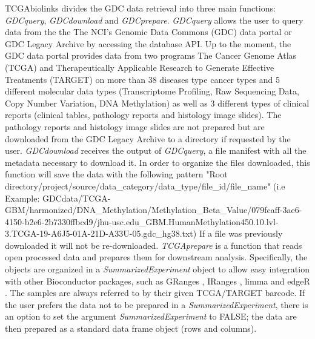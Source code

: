 TCGAbiolinks divides the GDC data retrieval into three main functions: \textit{GDCquery}, \textit{GDCdownload}
and \textit{GDCprepare}.
\textit{GDCquery} allows the user to query data from the the The NCI's Genomic Data Commons (GDC) data portal or GDC Legacy Archive by accessing the database API. Up to the moment, the GDC data portal provides data from two programs The Cancer Genome Atlas (TCGA) and Therapeutically Applicable Research to Generate Effective Treatments (TARGET)  on more
than 38 diseases type cancer types and 5 different molecular data types (Transcriptome Profiling, Raw Sequencing Data, Copy Number Variation, DNA Methylation) as well as 3 different types of clinical reports (clinical tables, pathology reports and histology image slides). The pathology
reports and histology image slides are not prepared
but are downloaded from the GDC Legacy Archive to a directory if requested by the user. \textit{GDCdownload} receives the output of \textit{GDCquery}, a file manifest with all the metadata necessary to download it. In order to organize the files downloaded, this function will save the data with the following pattern "Root directory/project/source/data\_category/data\_type/file\_id/file\_name" (i.e Example: GDCdata/TCGA-GBM/harmonized/DNA\_Methylation/Methylation\_Beta\_Value/079fcaff-3ae6-4150-b2e6-2b7330ffbcd9/jhu-usc.edu\_GBM.HumanMethylation450.10.lvl-3.TCGA-19-A6J5-01A-21D-A33U-05.gdc\_hg38.txt)
If a file was
previously downloaded it will not be re-downloaded. \textit{TCGAprepare} is a function that reads open processed data and prepares them for downstream analysis. Specifically, the objects are organized in a \textit{SummarizedExperiment}
object to allow easy integration
with other Bioconductor packages, such as GRanges \cite{lawrence2013software},
IRanges \cite{lawrence2013software}, limma \cite{ritchie2015limma} and edgeR \cite{robinson2010edger}. The samples are
always referred to by their given TCGA/TARGET barcode. If the user prefers the data not to be prepared in a \textit{SummarizedExperiment},
there is an option to set the argument \textit{SummarizedExperiment}
to FALSE; the data are then prepared as
a standard data frame object (rows and columns). 

